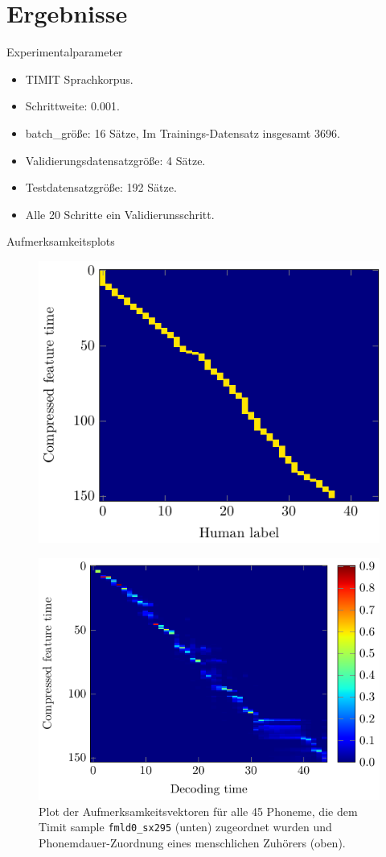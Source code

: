 \documentclass[10pt]{beamer}
\begin{document}
\section{Ergebnisse}

\begin{frame}{Experimentalparameter}

\begin{itemize}
	\item TIMIT Sprachkorpus.
	\item Schrittweite: 0.001.
	\item batch\_größe: 16 Sätze, Im Trainings-Datensatz insgesamt 3696.
	\item Validierungsdatensatzgröße: 4 Sätze.
	\item Testdatensatzgröße: 192 Sätze.
	\item Alle 20 Schritte ein Validierunsschritt.
\end{itemize}

\end{frame}

\begin{frame}{Aufmerksamkeitsplots}
	\begin{figure}
	\centering
	\includegraphics[width=0.2\linewidth, angle=90]{../tikz/align}
	\end{figure}
	\begin{figure}
	\centering
	\includegraphics[width=0.2\linewidth, angle=90]{../tikz/alpha}
	\caption{Plot der Aufmerksamkeitsvektoren für alle 45 Phoneme, die dem
	Timit sample \texttt{fmld0\_sx295} (unten) zugeordnet wurden und
	Phonemdauer-Zuordnung eines menschlichen Zuhörers (oben).}
	\label{fig:fullAttention}
	\end{figure}
\end{frame}
\end{document}
